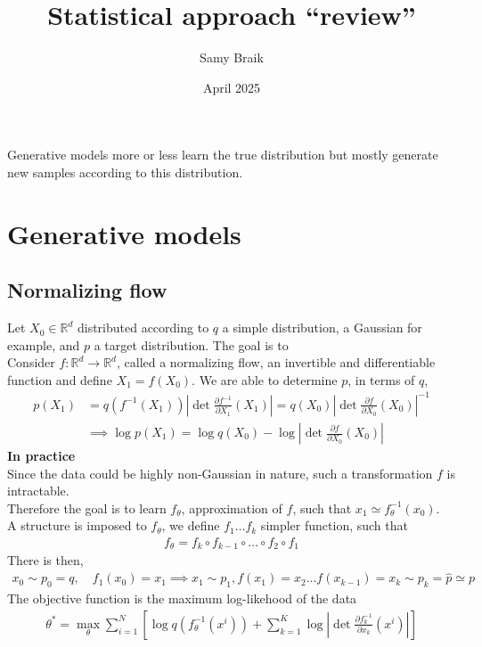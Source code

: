 \documentclass{article}
\title{Statistical approach ``review''}
\author{Samy Braik}
\date{April 2025}
\begin{document}
\maketitle

Generative models more or less learn the true distribution but mostly generate new samples according to this distribution.   
\section{Generative models}
\subsection{Normalizing flow}
Let $X_0\in\mathbb{R}^d$ distributed according to $q$ a simple distribution, a Gaussian for example, and $p$ a target distribution.  The goal is to 
\\
Consider $f:\mathbb{R}^d\rightarrow\mathbb{R}^d$, called a normalizing flow, an invertible and differentiable function and define $X_1=f(X_0)$. 
We are able to determine \(p\), in terms of \(q\), 
\begin{align}
    p(X_1)&=q(f^{-1}(X_1))\left| \det\frac{\partial f^{-1}}{\partial X_1}(X_1) \right| = q(X_0)\left| \det \frac{\partial f}{\partial X_0}(X_0) \right|^{-1} \\
    &\implies \log p(X_1)=\log q(X_0) - \log \left|  \det \frac{\partial f}{\partial X_0}(X_0) \right|  
\end{align}
\textbf{In practice} \\
Since the data could be highly non-Gaussian in nature, such a transformation $f$ is intractable.\\
Therefore the goal is to learn $f_\theta$, approximation of $f$, such that $x_1 \simeq f_\theta^{-1}(x_0)$. \\
A structure is imposed to $f_\theta$, we define $f_1\ldots f_k$ simpler function,  such that
\begin{align}
    f_\theta = f_k\circ f_{k-1}\circ\ldots\circ f_2\circ f_1
\end{align}
There is then, 
\begin{align}
    x_0\sim p_0=q, \quad f_1(x_0) = x_1 \implies x_1\sim p_1, f(x_1)=x_2 \ldots f(x_{k-1})=x_k \sim p_k = \hat{p} \simeq p
\end{align}
The objective function is the maximum log-likehood of the data
\begin{align}
    \theta^* = \max_{\theta} \sum_{i=1}^N \left[ \log q(f_\theta^{-1}(x^i)) + \sum_{k=1}^K \log \left| \det\frac{\partial f_k^{-1}}{\partial x_k}(x^i) \right| \right] 
\end{align}
\end{document}

